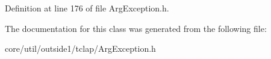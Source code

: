 Definition at line 176 of file Arg\+Exception.\+h.



The documentation for this class was generated from the following file\+:\begin{DoxyCompactItemize}
\item 
core/util/outside1/tclap/Arg\+Exception.\+h\end{DoxyCompactItemize}
